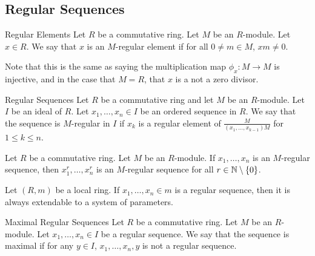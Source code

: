 \documentclass[a4paper]{article}
\begin{document}
\subsection{Regular Sequences}
\begin{defn}{Regular Elements}{} Let $R$ be a commutative ring. Let $M$ be an $R$-module. Let $x\in R$. We say that $x$ is an $M$-regular element if for all $0\neq m\in M$, $xm\neq 0$. 
\end{defn}

Note that this is the same as saying the multiplication map $\phi_x:M\to M$ is injective, and in the case that $M=R$, that $x$ is a not a zero divisor. 

\begin{defn}{Regular Sequences}{} Let $R$ be a commutative ring and let $M$ be an $R$-module. Let $I$ be an ideal of $R$. Let $x_1,\dots,x_n\in I$ be an ordered sequence in $R$. We say that the sequence is $M$-regular in $I$ if $x_k$ is a regular element of $\frac{M}{(x_1,\dots,x_{k-1})M}$ for $1\leq k\leq n$. 
\end{defn}

\begin{lmm}{}{} Let $R$ be a commutative ring. Let $M$ be an $R$-module. If $x_1,\dots,x_n$ is an $M$-regular sequence, then $x_1^r,\dots,x_n^r$ is an $M$-regular sequence for all $r\in\mathbb{N}\setminus\{0\}$. 
\end{lmm}

\begin{lmm}{}{} Let $(R,m)$ be a local ring. If $x_1,\dots,x_n\in m$ is a regular sequence, then it is always extendable to a system of parameters. 
\end{lmm}

\begin{defn}{Maximal Regular Sequences}{} Let $R$ be a commutative ring. Let $M$ be an $R$-module. Let $x_1,\dots,x_n\in I$ be a regular sequence. We say that the sequence is maximal if for any $y\in I$, $x_1,\dots,x_n,y$ is not a regular sequence. 
\end{defn}
\end{document}
